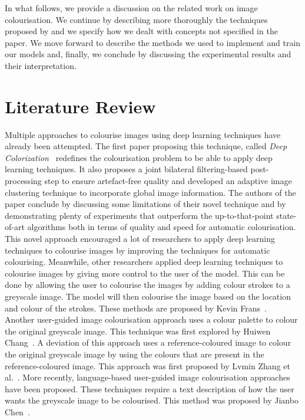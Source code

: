 \documentclass{article}
\begin{document}
In what follows, we provide a discussion on the related work on image colourisation. We continue by describing more thoroughly the techniques proposed by \cite{colourful} and we specify how we dealt with concepts not specified in the paper. We move forward to describe the methods we used to implement and train our models and, finally, we conclude by discussing the experimental results and their interpretation.

\section{Literature Review}
Multiple approaches to colourise images using deep learning techniques have already been attempted. The first paper proposing this technique, called \textit{Deep Colorization}~\cite{deep} redefines the colourisation problem to be able to apply deep learning techniques. It also proposes a joint bilateral filtering-based post-processing step to ensure artefact-free quality and developed an adaptive image clustering technique to incorporate global image information. The authors of the paper conclude by discussing some limitations of their novel technique and by demonstrating plenty of experiments that outperform the up-to-that-point state-of-art algorithms both in terms of quality and speed for automatic colourisation.\\
This novel approach encouraged a lot of researchers to apply deep learning techniques to colourise images by improving the techniques for automatic colourising. Meanwhile, other researchers applied deep learning techniques to colourise images by giving more control to the user of the model. This can be done by allowing the user to colourise the images by adding colour strokes to a greyscale image. The model will then colourise the image based on the location and colour of the strokes. These methods are proposed by Kevin Frans~\cite{pierre1}. \\
Another user-guided image colourisation approach uses a colour palette to colour the original greyscale image. This technique was first explored by Huiwen Chang~\cite{pierre2}. A deviation of this approach uses a reference-coloured image to colour the original greyscale image by using the colours that are present in the reference-coloured image. This approach was first proposed by Lvmin Zhang et al.~\cite{pierre3}. More recently, language-based user-guided image colourisation approaches have been proposed. These techniques require a text description of how the user wants the greyscale image to be colourised. This method was proposed by Jianbo Chen~\cite{pierre4}.\\
\end{document}
